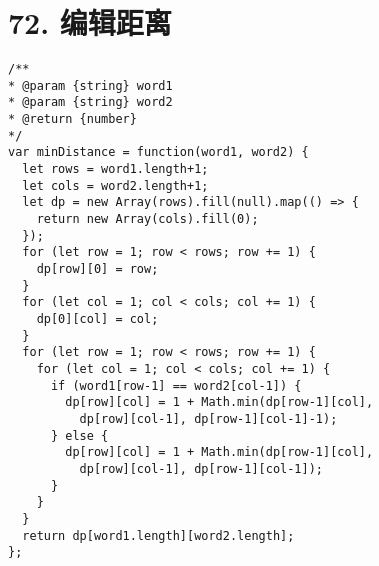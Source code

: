 \newpage
\section{72. 编辑距离}
\label{leetcode:72}

\begin{verbatim}
/**
* @param {string} word1
* @param {string} word2
* @return {number}
*/
var minDistance = function(word1, word2) {
  let rows = word1.length+1;
  let cols = word2.length+1;
  let dp = new Array(rows).fill(null).map(() => {
    return new Array(cols).fill(0);
  });
  for (let row = 1; row < rows; row += 1) {
    dp[row][0] = row;
  }
  for (let col = 1; col < cols; col += 1) {
    dp[0][col] = col;
  }
  for (let row = 1; row < rows; row += 1) {
    for (let col = 1; col < cols; col += 1) {
      if (word1[row-1] == word2[col-1]) {
        dp[row][col] = 1 + Math.min(dp[row-1][col],
          dp[row][col-1], dp[row-1][col-1]-1);
      } else {
        dp[row][col] = 1 + Math.min(dp[row-1][col],
          dp[row][col-1], dp[row-1][col-1]);
      }
    }
  }
  return dp[word1.length][word2.length];
};
\end{verbatim}
